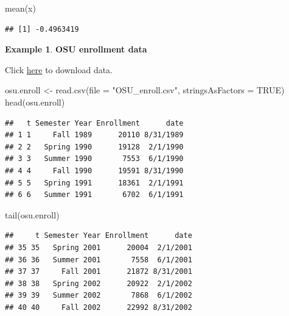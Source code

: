 \documentclass[
]{book}
\newenvironment{Shaded}{\begin{snugshade}}{\end{snugshade}}
\newcommand{\AttributeTok}[1]{\textcolor[rgb]{0.77,0.63,0.00}{#1}}
\newcommand{\ConstantTok}[1]{\textcolor[rgb]{0.00,0.00,0.00}{#1}}
\newcommand{\FunctionTok}[1]{\textcolor[rgb]{0.00,0.00,0.00}{#1}}
\newcommand{\NormalTok}[1]{#1}
\newcommand{\OtherTok}[1]{\textcolor[rgb]{0.56,0.35,0.01}{#1}}
\newcommand{\SpecialCharTok}[1]{\textcolor[rgb]{0.00,0.00,0.00}{#1}}
\newcommand{\StringTok}[1]{\textcolor[rgb]{0.31,0.60,0.02}{#1}}
\theoremstyle{definition}
\theoremstyle{definition}
\newtheorem{example}{Example}[chapter]
\theoremstyle{definition}
\theoremstyle{definition}
\theoremstyle{remark}
\begin{document}
\begin{Shaded}
\begin{Highlighting}[]
  \FunctionTok{mean}\NormalTok{(x)}
\end{Highlighting}
\end{Shaded}

\begin{verbatim}
## [1] -0.4963419
\end{verbatim}

\begin{example}

\textbf{OSU enrollment data}

Click \href{http://www.chrisbilder.com/stat878/sections/2/OSU_enroll.csv}{here} to download data.

\begin{Shaded}
\begin{Highlighting}[]
\NormalTok{  osu.enroll }\OtherTok{\textless{}{-}} \FunctionTok{read.csv}\NormalTok{(}\AttributeTok{file =} \StringTok{"OSU\_enroll.csv"}\NormalTok{, }\AttributeTok{stringsAsFactors =} \ConstantTok{TRUE}\NormalTok{)}
  \FunctionTok{head}\NormalTok{(osu.enroll)}
\end{Highlighting}
\end{Shaded}

\begin{verbatim}
##   t Semester Year Enrollment      date
## 1 1     Fall 1989      20110 8/31/1989
## 2 2   Spring 1990      19128  2/1/1990
## 3 3   Summer 1990       7553  6/1/1990
## 4 4     Fall 1990      19591 8/31/1990
## 5 5   Spring 1991      18361  2/1/1991
## 6 6   Summer 1991       6702  6/1/1991
\end{verbatim}

\begin{Shaded}
\begin{Highlighting}[]
  \FunctionTok{tail}\NormalTok{(osu.enroll)}
\end{Highlighting}
\end{Shaded}

\begin{verbatim}
##     t Semester Year Enrollment      date
## 35 35   Spring 2001      20004  2/1/2001
## 36 36   Summer 2001       7558  6/1/2001
## 37 37     Fall 2001      21872 8/31/2001
## 38 38   Spring 2002      20922  2/1/2002
## 39 39   Summer 2002       7868  6/1/2002
## 40 40     Fall 2002      22992 8/31/2002
\end{verbatim}

\begin{Shaded}
\end{Shaded}


\end{example}
\end{document}
